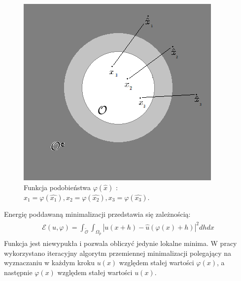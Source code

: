 \documentclass[12pt, twoside, openany]{report}
\theoremstyle{definition}
\newcommand*{\abs}[1]{\left\vert{#1}\right\vert}
\begin{document}
\begin{figure}[!h]
	\centering
	\includegraphics[scale=0.9]{rysunki/6_fig2}
	\caption{Funkcja podobieństwa $\varphi(\hat{x})$ : $x_1 = \varphi(\hat{x_1}), x_2 = \varphi(\hat{x_2}), x_3 = \varphi(\hat{x_3})$.}
	\label{6_fig2}
\end{figure}
Energię poddawaną minimalizacji przedstawia się zależnością:
\begin{align}
\begin{aligned}
\mathcal{E}(u,\varphi) = \int_{\mathcal{\widetilde{O}}}\int_{\Omega_p}\abs{u(x+h) - \hat{u}(\varphi(x)+h)}^2dhdx
\end{aligned}
\end{align}
Funkcja jest niewypukła i pozwala obliczyć jedynie lokalne minima. W pracy wykorzystano iteracyjny algorytm przemiennej minimalizacji polegający na wyznaczaniu w każdym kroku $u(x)$ względem stałej wartości $\varphi(x)$, a następnie $\varphi(x)$ względem stałej wartości $u(x)$.
\end{document}
